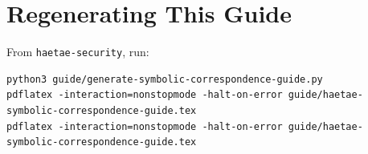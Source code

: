 \documentclass[10pt]{article}
\newcommand{\file}[1]{\nolinkurl{#1}}
\begin{document}
\section{Regenerating This Guide}
From \file{haetae-security}, run:
\begin{verbatim}
python3 guide/generate-symbolic-correspondence-guide.py
pdflatex -interaction=nonstopmode -halt-on-error guide/haetae-symbolic-correspondence-guide.tex
pdflatex -interaction=nonstopmode -halt-on-error guide/haetae-symbolic-correspondence-guide.tex
\end{verbatim}
\end{document}
